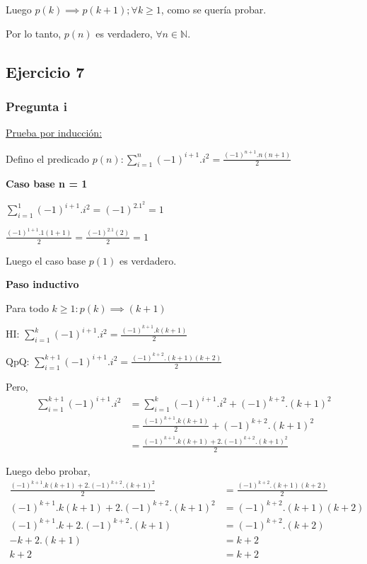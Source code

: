 Luego $p(k) \implies p(k+1); \forall k \geq 1$, como se quería probar.

Por lo tanto, $p(n)$ es verdadero, $\forall n \in \mathbb{N}$.

\subsection{Ejercicio 7}

\subsubsection{Pregunta i}

\underline{Prueba por inducción:}

Defino el predicado $p(n) : \sum_{i=1}^{n}(-1)^{i+1}.i^2= \frac{(-1)^{n+1}.n(n+1)}{2}$

\textbf{Caso base n = 1}

$ \sum_{i=1}^{1}(-1)^{i+1}.i^2 = (-1)^2.1^2=1$

$\frac{(-1)^{1+1}.1(1+1)}{2} = \frac{(-1)^2.1(2)}{2} = 1$

Luego el caso base $p(1)$ es verdadero.

\textbf{Paso inductivo}

Para todo $k \geq 1: p(k) \implies (k+1)$

HI: $\sum_{i=1}^{k}(-1)^{i+1}.i^2 = \frac{(-1)^{k+1}.k(k+1)}{2}$

QpQ: $\sum_{i=1}^{k+1}(-1)^{i+1}.i^2 = \frac{(-1)^{k+2}.(k+1)(k+2)}{2}$

Pero,
\begin{align*}
    \sum_{i=1}^{k+1}(-1)^{i+1}.i^2 &= \sum_{i=1}^{k}(-1)^{i+1}.i^2 + (-1)^{k+2}.(k+1)^2 \\
    &= \frac{(-1)^{k+1}.k(k+1)}{2} + (-1)^{k+2}.(k+1)^2 \\
    &= \frac{(-1)^{k+1}.k(k+1) + 2.(-1)^{k+2}.(k+1)^2}{2}
\end{align*}

Luego debo probar, 
\begin{align*}
    \frac{(-1)^{k+1}.k(k+1) + 2.(-1)^{k+2}.(k+1)^2}{2} &= \frac{(-1)^{k+2}.(k+1)(k+2)}{2} \\
    (-1)^{k+1}.k(k+1) + 2.(-1)^{k+2}.(k+1)^2 &= (-1)^{k+2}.(k+1)(k+2) \\
    (-1)^{k+1}.k + 2.(-1)^{k+2}.(k+1) &= (-1)^{k+2}.(k+2) \\
    -k + 2.(k+1) &= k+2 \\
    k+2 &= k+2 \\
\end{align*}

